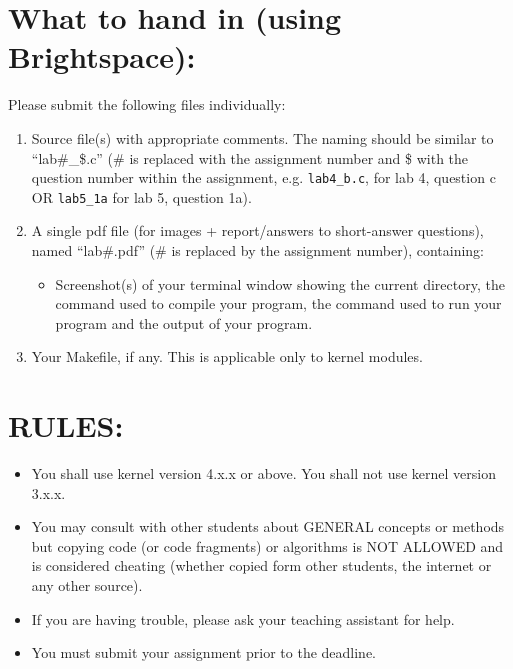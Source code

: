 \documentclass{article}
\begin{document}
\section*{What to hand in (using Brightspace): }
Please submit the following files individually:
\begin{enumerate}
    \item Source file(s) with appropriate comments. The naming should be similar to “lab\#\_\$.c” (\# is replaced with the assignment number and \$ with the question number within the assignment, e.g. \texttt{lab4\_b.c}, for lab 4, question c OR \texttt{lab5\_1a} for lab 5, question 1a).
    \item A single pdf file (for images + report/answers to short-answer questions), named “lab\#.pdf” (\# is replaced by the assignment number), containing:
    \begin{itemize}
        \item Screenshot(s) of your terminal window showing the current directory, the command used to compile your program, the command used to run your program and the output of your program.
    \end{itemize}
    \item Your Makefile, if any. This is applicable only to kernel modules.
\end{enumerate}

\section*{RULES:}
\begin{itemize}
    \item You shall use kernel version 4.x.x or above. You shall not use kernel version 3.x.x.
    \item You may consult with other students about GENERAL concepts or methods but copying code (or code fragments) or algorithms is NOT ALLOWED and is considered cheating (whether copied form other students, the internet or any other source).
    \item If you are having trouble, please ask your teaching assistant for help.
    \item You must submit your assignment prior to the deadline.
\end{itemize}
\end{document}
